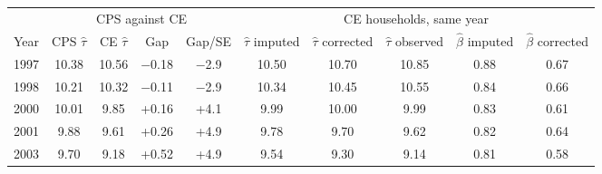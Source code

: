\footnotesize
\begin{tabular}{rccccccccc}
\toprule
& \multicolumn{4}{c}{CPS against CE} & \multicolumn{5}{c}{CE households, same year} \\
\cmidrule(lr){2-5}\cmidrule(lr){6-10}
Year & CPS $\hat\tau$ & CE $\hat\tau$ & Gap & Gap/SE & $\hat\tau$ imputed & $\hat\tau$ corrected & $\hat\tau$ observed & $\hat\beta$ imputed & $\hat\beta$ corrected \\
\midrule
1997 & 10.38 & 10.56 & $-$0.18 & $-$2.9 & 10.50 & 10.70 & 10.85 & 0.88 & 0.67 \\
1998 & 10.21 & 10.32 & $-$0.11 & $-$2.9 & 10.34 & 10.45 & 10.55 & 0.84 & 0.66 \\
2000 & 10.01 & 9.85 & +0.16 & +4.1 & 9.99 & 10.00 & 9.99 & 0.83 & 0.61 \\
2001 & 9.88 & 9.61 & +0.26 & +4.9 & 9.78 & 9.70 & 9.62 & 0.82 & 0.64 \\
2003 & 9.70 & 9.18 & +0.52 & +4.9 & 9.54 & 9.30 & 9.14 & 0.81 & 0.58 \\
\bottomrule
\end{tabular}
